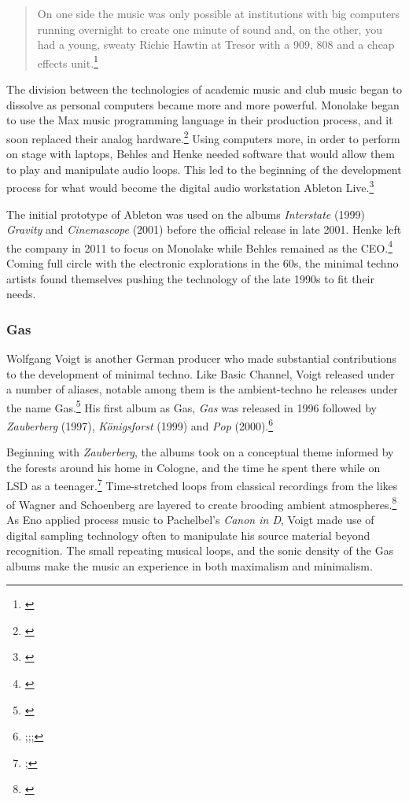 \documentclass[12pt,twoside]{reedthesis}
\begin{document}
\begin{quote}
On one side the music was only possible at institutions with big computers running overnight to create one minute of sound and, on the other, you had a young, sweaty Richie Hawtin at Tresor with a 909, 808 and a cheap effects unit.\footnote{\cite{burnsMonolakeSoundScientist2012}}
\end{quote}

The division between the technologies of academic music and club music began to dissolve as personal computers became more and more powerful. Monolake began to use the Max music programming language in their production process, and it soon replaced their analog hardware.\footnote{\cite{maya-roisinslaterGerhardBehlesRobert2016}} Using computers more, in order to perform on stage with laptops, Behles and Henke needed software that would allow them to play and manipulate audio loops. This led to the beginning of the development process for what would become the digital audio workstation Ableton Live.\footnote{\cite{maya-roisinslaterGerhardBehlesRobert2016}}

The initial prototype of Ableton was used on the albums \emph{Interstate} (1999) \emph{Gravity} and \emph{Cinemascope} (2001) before the official release in late 2001. Henke left the company in 2011 to focus on Monolake while Behles remained as the CEO.\footnote{\cite{maya-roisinslaterGerhardBehlesRobert2016}} Coming full circle with the electronic explorations in the 60s, the minimal techno artists found themselves pushing the technology of the late 1990s to fit their needs.

\subsubsection{Gas}
Wolfgang Voigt is another German producer who made substantial contributions to the development of minimal techno. Like Basic Channel, Voigt released under a number of aliases, notable among them is the ambient-techno he releases under the name Gas.\footnote{\cite{bacherWolfgangVoigt2018}} His first album as Gas, \emph{Gas} was released in 1996 followed by \emph{Zauberberg} (1997), \emph{K{\"o}nigsforst} (1999) and \emph{Pop} (2000).\footnote{\cite{gasGas1996};\cite{gasZauberberg1997};\cite{gasKonigsforst1999};\cite{gasPop2000}}

Beginning with \emph{Zauberberg}, the albums took on a conceptual theme informed by the forests around his home in Cologne, and the time he spent there while on LSD as a teenager.\footnote{\cite{mattfulkersonInterviewWolfgangVoigt2016};\cite{betaGasAmbientTechno2018}} Time-stretched loops from classical recordings from the likes of Wagner and Schoenberg are layered to create brooding ambient atmospheres.\footnote{\cite{betaGasAmbientTechno2018}} As Eno applied process music to Pachelbel's \emph{Canon in D}, Voigt made use of digital sampling technology often to manipulate his source material beyond recognition. The small repeating musical loops, and the sonic density of the Gas albums make the music an experience in both maximalism and minimalism.
\end{document}
